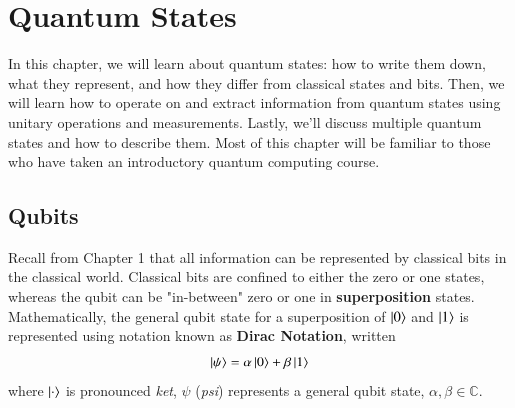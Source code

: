 \chapter[Quantum States]{Quantum States}
\label{sec:2_quantum_states}





In this chapter, we will learn about quantum states: how to write them down, what they represent, and how they differ from classical states and bits.
Then, we will learn how to operate on and extract information from quantum states using unitary operations and measurements. Lastly, we'll discuss multiple quantum states and how to describe them.  Most of this chapter will be familiar to those who have taken an introductory quantum computing course.


\section{Qubits}



Recall from Chapter 1 that all information can be represented by classical bits in the classical world. Classical bits are confined to either the zero or one states, whereas the qubit can be "in-between" zero or one in  \textbf{superposition} states. Mathematically, the general qubit state for a superposition of $\left| 0 \right\rangle$ and $\left| 1 \right\rangle$ is represented using notation known as \textbf{Dirac Notation}, written
\begin{equation}
\left| \psi \right\rangle = \alpha \left| 0 \right\rangle + \beta\left| 1 \right\rangle 
\end{equation}
 where $\left| \cdot \right\rangle$ is pronounced \emph{ket}, $\psi$ (\emph{psi}) represents a general qubit state, $\alpha,\beta \in \mathbb{C}$.\label{def:ket}





